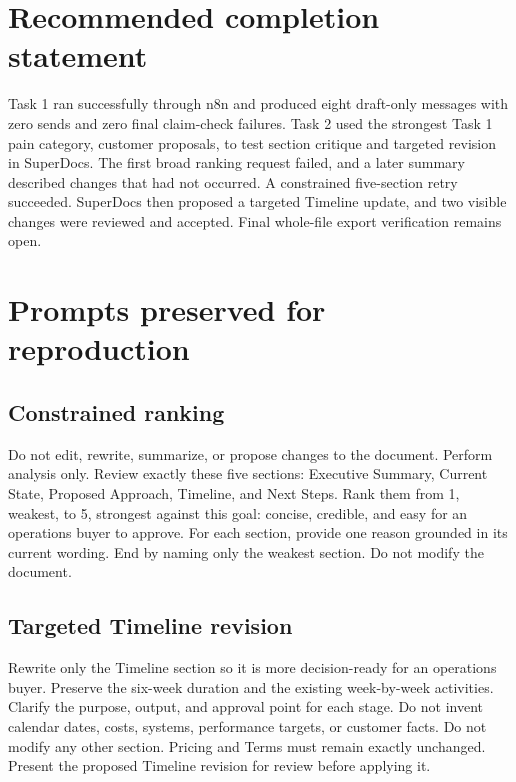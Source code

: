 \documentclass[11pt,a4paper]{article}
\newcommand{\evidencebox}[1]{\begin{center}\colorbox{Soft}{\parbox{0.92\textwidth}{#1}}\end{center}}
\begin{document}
\section{Recommended completion statement}

\evidencebox{Task 1 ran successfully through n8n and produced eight draft-only messages with zero sends and zero final claim-check failures. Task 2 used the strongest Task 1 pain category, customer proposals, to test section critique and targeted revision in SuperDocs. The first broad ranking request failed, and a later summary described changes that had not occurred. A constrained five-section retry succeeded. SuperDocs then proposed a targeted Timeline update, and two visible changes were reviewed and accepted. Final whole-file export verification remains open.}

\appendix
\section{Prompts preserved for reproduction}

\subsection{Constrained ranking}

\evidencebox{Do not edit, rewrite, summarize, or propose changes to the document. Perform analysis only. Review exactly these five sections: Executive Summary, Current State, Proposed Approach, Timeline, and Next Steps. Rank them from 1, weakest, to 5, strongest against this goal: concise, credible, and easy for an operations buyer to approve. For each section, provide one reason grounded in its current wording. End by naming only the weakest section. Do not modify the document.}

\subsection{Targeted Timeline revision}

\evidencebox{Rewrite only the Timeline section so it is more decision-ready for an operations buyer. Preserve the six-week duration and the existing week-by-week activities. Clarify the purpose, output, and approval point for each stage. Do not invent calendar dates, costs, systems, performance targets, or customer facts. Do not modify any other section. Pricing and Terms must remain exactly unchanged. Present the proposed Timeline revision for review before applying it.}
\end{document}
